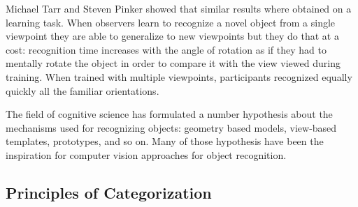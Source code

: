 Michael Tarr and Steven Pinker \cite{Tarr1989MentalRA} showed that similar results where obtained on a learning task. When observers learn to recognize a novel object from a single viewpoint they are able to generalize to new viewpoints but they do that at a cost: recognition time increases with the angle of rotation as if they had to mentally rotate the object in order to compare it with the view viewed during training. When trained with multiple viewpoints, participants recognized equally quickly all the familiar orientations. 

The field of cognitive science has formulated a number hypothesis about the mechanisms used for recognizing objects: geometry based models, view-based templates, prototypes, and so on. Many of those hypothesis have been the inspiration for computer vision approaches for object recognition. 








\subsection{Principles of Categorization}

